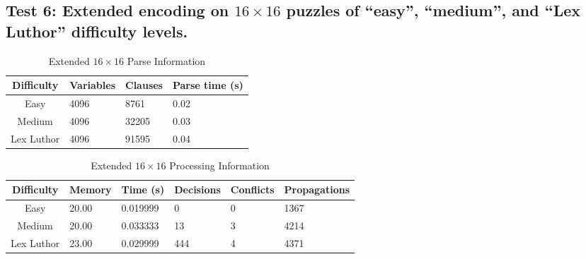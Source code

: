 \documentclass[conference,draftclsnofoot]{IEEEtran}
\begin{document}
\subsection{Test 6: Extended encoding	on $16 \times 16$ puzzles of ``easy'',
``medium'', and ``Lex Luthor'' difficulty levels.}
\FloatBarrier
\begin{table}[!h]
	\centering
	\begin{tabular}{c | l l l}
		Difficulty & Variables & Clauses & Parse time (s) \\\hline
		Easy		& 4096 & 8761  & 0.02\\
		Medium 		& 4096 & 32205 & 0.03\\
		Lex Luthor 	& 4096 & 91595 & 0.04\\
	\end{tabular}
	\caption{Extended $16 \times 16$ Parse Information}
	\label{tab:extended_16x16_parse}
\end{table}
\begin{table}[!h]
	\centering

	\begin{tabular}{c | l l p{20pt} p{20pt} l }
		Difficulty & Memory & Time (s) & Decisions &
		Conflicts & Propagations \\\hline
		Easy 		& 20.00 & 0.019999 & 0 & 0 & 1367\\
		Medium 		& 20.00 & 0.033333 & 13 & 3 & 4214\\
		Lex Luthor 	& 23.00 & 0.029999 & 444 & 4 & 4371
	\end{tabular}
	\caption{Extended $16\times 16$ Processing Information}
	\label{tab:extended_16x16_proc}
\end{table}
\FloatBarrier

\newpage
\end{document}
